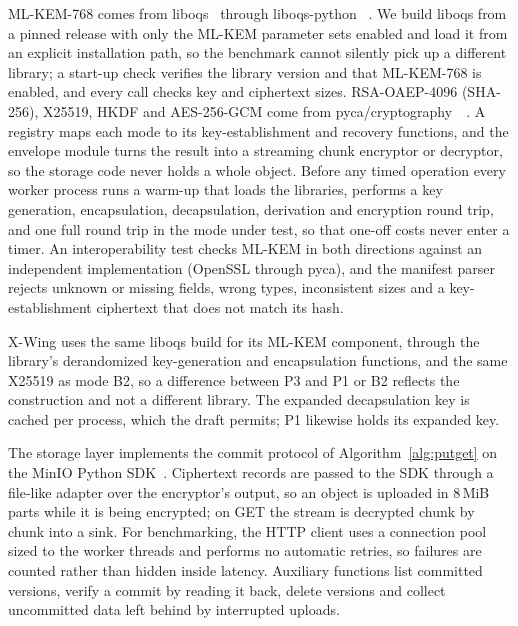 \documentclass[review,12pt]{elsarticle}
\begin{document}
ML-KEM-768 comes from liboqs~\LiboqsVersion{} through liboqs-python~\LiboqsPyVersion{}
\cite{liboqs,liboqspython}. We build liboqs from a pinned release with only the ML-KEM parameter
sets enabled and load it from an explicit installation path, so the benchmark cannot silently pick up a different library; a start-up check verifies the library version and that ML-KEM-768 is enabled, and every call checks key and ciphertext sizes.
RSA-OAEP-4096 (SHA-256), X25519, HKDF and AES-256-GCM come from
pyca/cryptography~\CryptographyVersion{}~\cite{pyca}. A registry maps each mode to its
key-establishment and recovery functions, and the envelope module turns the result into a
streaming chunk encryptor or decryptor, so the storage code never holds a whole object. Before
any timed operation every worker process runs a warm-up that loads the libraries, performs a key generation, encapsulation, decapsulation, derivation and encryption round trip, and one full round trip in the mode under test, so that one-off costs never enter a timer.
An interoperability test checks ML-KEM in both directions against an independent implementation
(OpenSSL through pyca), and the manifest parser rejects unknown or missing fields, wrong types, inconsistent sizes and a key-establishment ciphertext that does not match its hash.

X-Wing uses the same liboqs build for its ML-KEM component, through the library's derandomized
key-generation and encapsulation functions, and the same X25519 as mode B2, so a difference
between P3 and P1 or B2 reflects the construction and not a different library. The expanded
decapsulation key is cached per process, which the draft permits; P1 likewise holds its expanded
key.

The storage layer implements the commit protocol of Algorithm~\ref{alg:putget} on the MinIO
Python SDK~\MinioPyVersion. Ciphertext records are passed to the SDK through a file-like adapter
over the encryptor's output, so an object is uploaded in 8\,MiB parts while it is being encrypted;
on GET the stream is decrypted chunk by chunk into a sink. For benchmarking, the HTTP client uses a connection pool sized to the worker threads and performs no automatic retries, so failures are counted rather
than hidden inside latency. Auxiliary functions list committed versions, verify a commit by reading
it back, delete versions and collect uncommitted data left behind by interrupted uploads.
\end{document}
